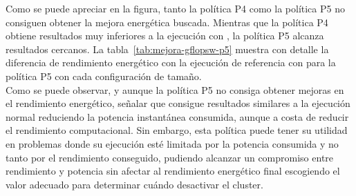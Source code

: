 Como se puede apreciar en la figura, tanto la política P4 como la política
P5 no consiguen obtener la mejora energética buscada. Mientras que la
política P4 obtiene resultados muy inferiores a la ejecución con \botlev,
la política P5 alcanza resultados cercanos. La
tabla~\ref{tab:mejora-gflopsw-p5} muestra con detalle la diferencia de
rendimiento energético con la ejecución de referencia con \botlev para la
política P5 con cada configuración de tamaño.\\
Como se puede observar, y aunque la política P5 no consiga obtener mejoras
en el rendimiento energético, señalar que consigue resultados similares a
la ejecución normal reduciendo la potencia instantánea consumida, aunque a
costa de reducir el rendimiento computacional. Sin embargo, esta política
puede tener su utilidad en problemas donde su ejecución esté limitada por
la potencia consumida y no tanto por el rendimiento conseguido, pudiendo
alcanzar un compromiso entre rendimiento y potencia sin afectar al
rendimiento energético final escogiendo el valor adecuado para determinar
cuándo desactivar el cluster.\\

